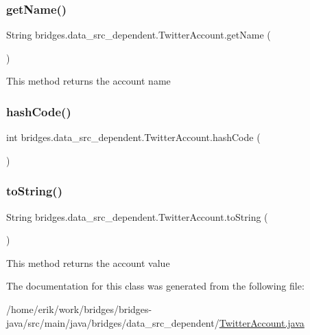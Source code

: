 \subsubsection{\texorpdfstring{get\+Name()}{getName()}}
{\footnotesize\ttfamily String bridges.\+data\+\_\+src\+\_\+dependent.\+Twitter\+Account.\+get\+Name (\begin{DoxyParamCaption}{ }\end{DoxyParamCaption})}

This method returns the account name \mbox{\label{classbridges_1_1data__src__dependent_1_1_twitter_account_a2f89f6f336b1bd39f0cf3aa444c76885}} 
\subsubsection{\texorpdfstring{hash\+Code()}{hashCode()}}
{\footnotesize\ttfamily int bridges.\+data\+\_\+src\+\_\+dependent.\+Twitter\+Account.\+hash\+Code (\begin{DoxyParamCaption}{ }\end{DoxyParamCaption})}

\mbox{\label{classbridges_1_1data__src__dependent_1_1_twitter_account_af4dd5dfe1a1556fa57f917fb24d8d6f2}} 
\subsubsection{\texorpdfstring{to\+String()}{toString()}}
{\footnotesize\ttfamily String bridges.\+data\+\_\+src\+\_\+dependent.\+Twitter\+Account.\+to\+String (\begin{DoxyParamCaption}{ }\end{DoxyParamCaption})}

This method returns the account value 

The documentation for this class was generated from the following file\+:\begin{DoxyCompactItemize}
\item 
/home/erik/work/bridges/bridges-\/java/src/main/java/bridges/data\+\_\+src\+\_\+dependent/\hyperlink{_twitter_account_8java}{Twitter\+Account.\+java}\end{DoxyCompactItemize}
